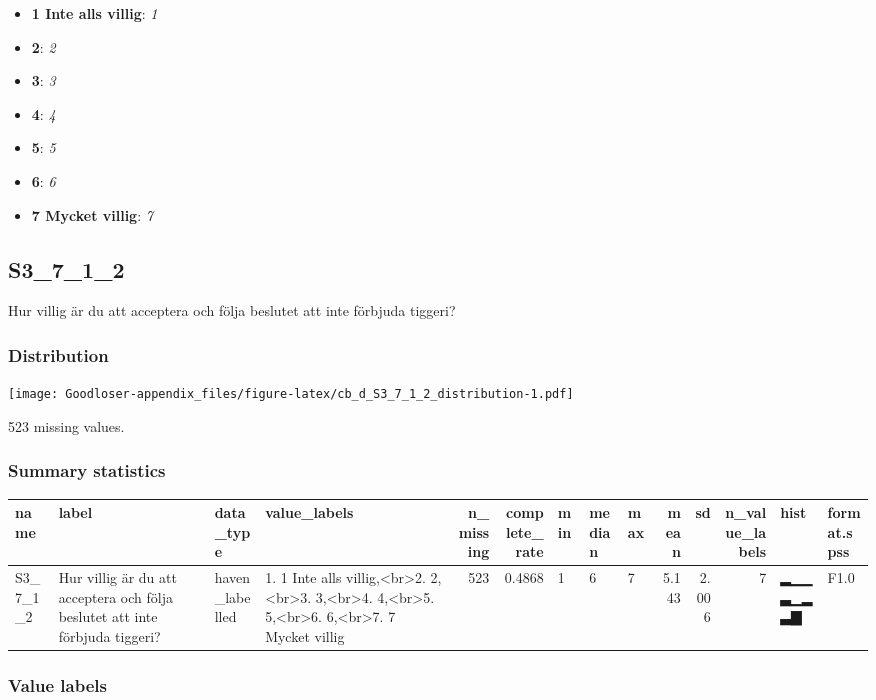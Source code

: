 \documentclass[
]{book}
\providecommand{\tightlist}{%
  \setlength{\itemsep}{0pt}\setlength{\parskip}{0pt}}
\begin{document}
\begin{itemize}
\tightlist
\item
  \textbf{1 Inte alls villig}: \emph{1}
\item
  \textbf{2}: \emph{2}
\item
  \textbf{3}: \emph{3}
\item
  \textbf{4}: \emph{4}
\item
  \textbf{5}: \emph{5}
\item
  \textbf{6}: \emph{6}
\item
  \textbf{7 Mycket villig}: \emph{7}
\end{itemize}

\hypertarget{S3_7_1_2}{%
\subsection{S3\_7\_1\_2}\label{S3_7_1_2}}

Hur villig är du att acceptera och följa beslutet att inte förbjuda tiggeri?

\hypertarget{S3_7_1_2_distribution}{%
\subsubsection{Distribution}\label{S3_7_1_2_distribution}}

\texttt{[image: Goodloser-appendix\_files/figure-latex/cb\_d\_S3\_7\_1\_2\_distribution-1.pdf]}

523 missing values.

\hypertarget{S3_7_1_2_summary}{%
\subsubsection{Summary statistics}\label{S3_7_1_2_summary}}

\begin{tabular}{l|l|l|l|r|r|l|l|l|r|r|r|l|l}
\hline
name & label & data_type & value_labels & n_missing & complete_rate & min & median & max & mean & sd & n_value_labels & hist & format.spss\\
\hline
S3_7_1_2 & Hur villig är du att acceptera och följa beslutet att inte förbjuda tiggeri? & haven_labelled & 1. 1 Inte alls villig,<br>2. 2,<br>3. 3,<br>4. 4,<br>5. 5,<br>6. 6,<br>7. 7 Mycket villig & 523 & 0.4868 & 1 & 6 & 7 & 5.143 & 2.006 & 7 & ▂▁▁▃▁▂▃▇ & F1.0\\
\hline
\end{tabular}

\hypertarget{S3_7_1_2_labels}{%
\subsubsection{Value labels}\label{S3_7_1_2_labels}}
\end{document}
